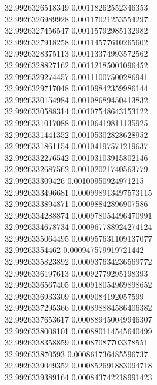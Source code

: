 {32.9926326518349	0.00118262552346353\\
32.9926326989928	0.00117021253554297\\
32.9926327456547	0.00115792985132982\\
32.9926327918258	0.00114577610265602\\
32.9926328375113	0.00113374993572562\\
32.9926328827162	0.00112185001096452\\
32.9926329274457	0.00111007500286941\\
32.9926329717048	0.00109842359986144\\
32.9926330154984	0.00108689450413832\\
32.9926330588314	0.00107548643153122\\
32.9926331017088	0.00106419811135925\\
32.9926331441352	0.00105302828628952\\
32.9926331861154	0.00104197571219637\\
32.9926332276542	0.00103103915802146\\
32.9926332687562	0.00102021740563779\\
32.992633309426	0.00100950924971215\\
32.9926333496681	0.000998913497573115\\
32.9926333894871	0.00098842896907586\\
32.9926334288874	0.000978054496470991\\
32.9926334678734	0.000967788924274124\\
32.9926335064495	0.000957631109137077\\
32.99263354462	0.000947579919721442\\
32.9926335823892	0.000937634236569772\\
32.9926336197613	0.00092779295198393\\
32.9926336567405	0.000918054969898652\\
32.9926336933309	0.0009084192057599\\
32.9926337295366	0.000898884586406382\\
32.9926337653617	0.000889450049946307\\
32.9926338008101	0.000880114545640499\\
32.9926338358859	0.00087087703378551\\
32.992633870593	0.000861736485596737\\
32.9926339049352	0.000852691883094718\\
32.9926339389164	0.000843742218991423\\
}
